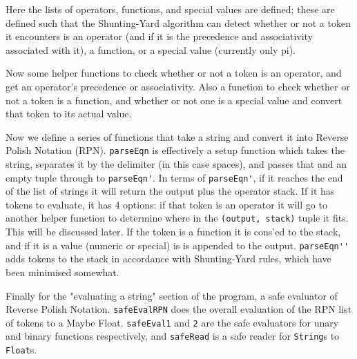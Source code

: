 \documentclass[12pt]{article}
\begin{document}


Here the lists of operators, functions, and special values are defined; these are defined such that the Shunting-Yard algorithm can detect whether or not a token it encounters is an operator (and if it is the precedence and associativity associated with it), a function, or a special value (currently only pi).



Now some helper functions to check whether or not a token is an operator, and get an operator's precedence or associativity.
Also a function to check whether or not a token is a function, and whether or not one is a special value and convert that token to its actual value.



Now we define a series of functions that take a string and convert it into Reverse Polish Notation (RPN).
\verb|parseEqn| is effectively a setup function which takes the string, separates it by the delimiter (in this case spaces), and passes that and an empty tuple through to \verb|parseEqn'|.
In terms of \verb|parseEqn'|, if it reaches the end of the list of strings it will return the output plus the operator stack.
If it has tokens to evaluate, it has 4 options: if that token is an operator it will go to another helper function to determine where in the \verb|(output, stack)| tuple it fits.
This will be discussed later.
If the token is a function it is cons'ed to the stack, and if it is a value (numeric or special) is is appended to the output.
\verb|parseEqn''| adds tokens to the stack in accordance with Shunting-Yard rules, which have been minimised somewhat.



Finally for the "evaluating a string" section of the program, a safe evaluator of Reverse Polish Notation.
\verb|safeEvalRPN| does the overall evaluation of the RPN list of tokens to a Maybe Float.
\verb|safeEval1| and \verb|2| are the safe evaluators for unary and binary functions respectively, and \verb|safeRead| is a safe reader for \verb|String|s to \verb|Float|s.
\end{document}

